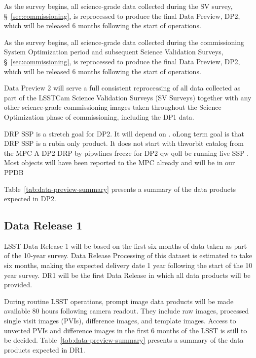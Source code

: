 As the survey begins, all science-grade data collected during the SV survey, \S~\ref{sec:commissioning}, is reprocessed to produce the final Data Preview, DP2, which will be released 6 months following the start of operations.


As the survey begins, all science-grade data collected during the commissioning System Optimization period and subsequent Science Validation Surveys, \S~\ref{sec:commissioning}, is reprocessed to produce the final Data Preview, DP2, which will be released 6 months following the start of operations.

Data Preview 2 will serve a full consistent reprocessing of all data collected as part of the LSSTCam Science Validation Surveys (SV Surveys) together with any other science-grade commissioning images taken throughout the Science Optimization phase of commissioning, including the DP1 data. 


DRP SSP is a stretch goal for DP2. It will depend on . oLong term goal is that DRP SSP is a rubin only product. It does not start with thworbit catalog from the MPC 
A DP2 DRP 
by pipwlines freeze for DP2 qw qoll be running live SSP .
Most objects will have been reported to the MPC already and will be in our PPDB


Table~\ref{tab:data-preview-summary} presents a summary of the data products expected in DP2.

\subsection{Data Release 1}
\label{sec:dr1}

LSST Data Release 1 will be based on the first six months of data taken as part of the 10-year survey. 
Data Release Processing of this dataset is estimated to take six months, making the expected delivery date 1 year following the start of the 10 year survey. 
DR1 will be the first Data Release in which all data products will be provided.

During routine LSST operations, prompt image data products will be made available 80 hours following camera readout. 
They include raw images, processed single visit images (PVIs), difference images, and template images. 
Access to unvetted PVIs and difference images in the first 6 months of the LSST is still to be decided. 
Table~\ref{tab:data-preview-summary} presents a summary of the data products expected in DR1.



